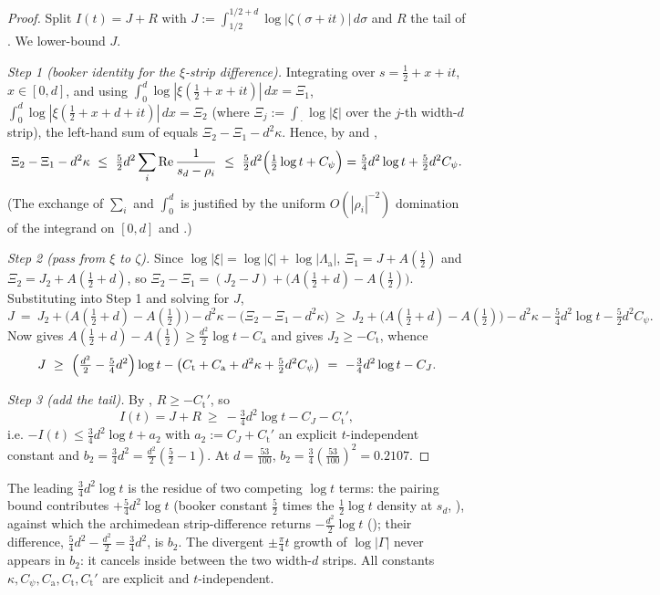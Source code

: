 \begin{proof}
\leanok
{}
Split $I(t)=J+R$ with $J:=\int_{1/2}^{1/2+d}\log|\zeta(\sigma+it)|\,d\sigma$ and $R$ the
tail of . We lower-bound $J$.

\emph{Step 1 (booker identity for the $\xi$-strip difference).} Integrating
 over $s=\tfrac12+x+it$, $x\in[0,d]$, and using
$\int_0^d\log|\xi(\tfrac12+x+it)|\,dx=\Xi_1$,
$\int_0^d\log|\xi(\tfrac12+x+d+it)|\,dx=\Xi_2$ (where
$\Xi_j:=\int_{\,\cdot}\log|\xi|$ over the $j$-th width-$d$ strip), the left-hand sum of
 equals $\Xi_2-\Xi_1-d^2\kappa$. Hence, by
 and ,
\[
  \Xi_2-\Xi_1-d^2\kappa
  \ \le\ \tfrac52 d^2\sum_i\operatorname{Re}\frac1{s_d-\rho_i}
  \ \le\ \tfrac52 d^2\Bigl(\tfrac12\log t+C_\psi\Bigr)
  =\tfrac54 d^2\log t+\tfrac52 d^2C_\psi.
\]
(The exchange of $\sum_i$ and $\int_0^d$ is justified by the uniform $O(|\rho_i|^{-2})$
domination of the integrand on $[0,d]$ and .)

\emph{Step 2 (pass from $\xi$ to $\zeta$).} Since $\log|\xi|=\log|\zeta|+\log|\Lambda_{\mathrm a}|$,
$\Xi_1=J+A(\tfrac12)$ and $\Xi_2=J_2+A(\tfrac12+d)$, so
$\Xi_2-\Xi_1=(J_2-J)+\bigl(A(\tfrac12+d)-A(\tfrac12)\bigr)$. Substituting into Step 1
and solving for $J$,
\[
  J\ =\ J_2+\bigl(A(\tfrac12+d)-A(\tfrac12)\bigr)-d^2\kappa-\bigl(\Xi_2-\Xi_1-d^2\kappa\bigr)
  \ \ge\ J_2+\bigl(A(\tfrac12+d)-A(\tfrac12)\bigr)-d^2\kappa-\tfrac54 d^2\log t-\tfrac52 d^2C_\psi.
\]
Now  gives $A(\tfrac12+d)-A(\tfrac12)\ge\tfrac{d^2}2\log t-C_{\mathrm a}$
and  gives $J_2\ge-C_{\mathrm t}$, whence
\[
  J\ \ge\ \Bigl(\tfrac{d^2}2-\tfrac54 d^2\Bigr)\log t
    -\bigl(C_{\mathrm t}+C_{\mathrm a}+d^2\kappa+\tfrac52 d^2C_\psi\bigr)
  \ =\ -\tfrac34 d^2\log t-C_J.
\]

\emph{Step 3 (add the tail).} By , $R\ge-C_{\mathrm t}'$, so
\[
  I(t)=J+R\ \ge\ -\tfrac34 d^2\log t-C_J-C_{\mathrm t}',
\]
i.e. $-I(t)\le\tfrac34 d^2\log t+a_2$ with $a_2:=C_J+C_{\mathrm t}'$ an explicit
$t$-independent constant and $b_2=\tfrac34 d^2=\tfrac{d^2}2(\tfrac52-1)$. At
$d=\tfrac{53}{100}$, $b_2=\tfrac34(\tfrac{53}{100})^2=0.2107$.
\end{proof}

\begin{remark}
The leading $\tfrac34 d^2\log t$ is the residue of two competing $\log t$ terms: the
pairing bound contributes $+\tfrac54 d^2\log t$ (booker constant $\tfrac52$ times the
$\tfrac12\log t$ density at $s_d$, ), against which the
archimedean strip-difference returns $-\tfrac{d^2}2\log t$ (); their
difference, $\tfrac54 d^2-\tfrac{d^2}2=\tfrac34 d^2$, is $b_2$. The divergent
$\pm\tfrac\pi4 t$ growth of $\log|\Gamma|$ never appears in $b_2$: it cancels inside
 between the two width-$d$ strips. All constants
$\kappa,C_\psi,C_{\mathrm a},C_{\mathrm t},C_{\mathrm t}'$ are explicit and
$t$-independent.
\end{remark}
